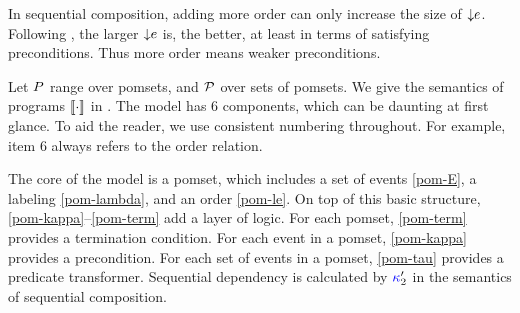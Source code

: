 In sequential composition, adding more order can only increase the size of
${\smash{\downarrow}e}{}$.  Following , the larger
${\smash{\downarrow}e}{}$ is, the better, at least in terms of satisfying
preconditions.  Thus more order means weaker preconditions.


Let $P$ range over pomsets, and $\mathcal{P}$ over sets of pomsets.
We give the semantics of programs $\sembase{}$ in .
%
The model has $6$ components, which can be daunting at first glance.  To aid
the reader, we use consistent numbering throughout. For example, item $6$
always refers to the order relation.

The core of the model is a pomset, which includes a set of events
\eqref{pom-E}, a labeling \eqref{pom-lambda}, and an order \eqref{pom-le}.
%
On top of this basic structure, \ref{pom-kappa}--\ref{pom-term} add a layer
of logic.  For each pomset, \ref{pom-term} provides a termination condition.
For each event in a pomset, \ref{pom-kappa} provides a precondition.  For
each set of events in a pomset, \ref{pom-tau} provides a predicate
transformer.  Sequential dependency is calculated by ${\color{blue}\kappa}'_2$ in
the semantics of sequential composition.


